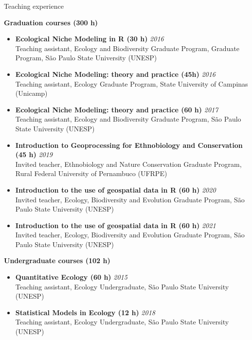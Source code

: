 \documentclass{resume}
\begin{document}
\begin{rSection}{Teaching experience}

{\bf Graduation courses (300 h)}
\begin{itemize} 
\item {\bf Ecological Niche Modeling in R (30 h)} \hfill{\em 2016}\\
Teaching assistant, Ecology and Biodiversity Graduate Program, Graduate Program, São Paulo State University (UNESP)

\item {\bf Ecological Niche Modeling: theory and practice (45h)} \hfill{\em 2016}\\
Teaching assistant, Ecology Graduate Program, State University of Campinas (Unicamp)

\item {\bf Ecological Niche Modeling: theory and practice (60 h)} \hfill{\em 2017}\\
Teaching assistant, Ecology and Biodiversity Graduate Program, São Paulo State University (UNESP)

\item {\bf Introduction to Geoprocessing for Ethnobiology and Conservation (45 h)} \hfill{\em 2019}\\
Invited teacher, Ethnobiology and Nature Conservation Graduate Program, Rural Federal University of Pernambuco (UFRPE)

\item {\bf Introduction to the use of geospatial data in R (60 h)} \hfill{\em 2020}\\
Invited teacher, Ecology, Biodiversity and Evolution Graduate Program, São Paulo State University (UNESP)

\item {\bf Introduction to the use of geospatial data in R (60 h)} \hfill{\em 2021}\\
Invited teacher, Ecology, Biodiversity and Evolution Graduate Program, São Paulo State University (UNESP)
\end{itemize}

{\bf Undergraduate courses (102 h)}
\begin{itemize}
\item {\bf Quantitative Ecology (60 h)} \hfill{\em 2015}\\
Teaching assistant, Ecology Undergraduate, São Paulo State University (UNESP)

\item {\bf Statistical Models in Ecology (12 h)} \hfill{\em 2018}\\
Teaching assistant, Ecology Undergraduate, São Paulo State University (UNESP)


\end{itemize}
\end{rSection}
\end{document}
